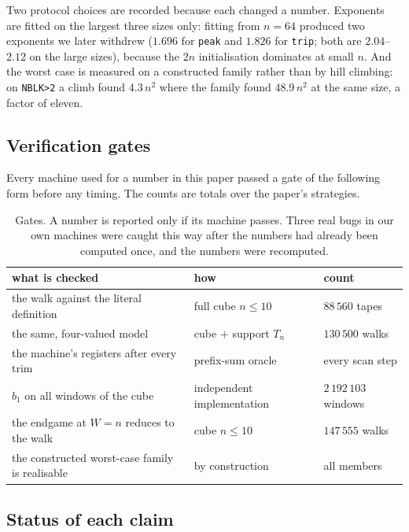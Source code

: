Two protocol choices are recorded because each changed a number. Exponents are fitted on the largest
three sizes only: fitting from $n=64$ produced two exponents we later withdrew ($1.696$ for
\texttt{peak} and $1.826$ for \texttt{trip}; both are $2.04$--$2.12$ on the large sizes), because the
$2n$ initialisation dominates at small $n$. And the worst case is measured on a constructed family
rather than by hill climbing: on \texttt{NBLK>2} a climb found $4.3\,n^{2}$ where the family found
$48.9\,n^{2}$ at the same size, a factor of eleven.

\subsection{Verification gates}
\label{app:gates}

Every machine used for a number in this paper passed a gate of the
following form before any timing. The counts are totals over the paper's
strategies.

\begin{table}[h]
\centering
\small
\begin{tabular}{@{}lll@{}}
\toprule
what is checked & how & count \\
\midrule
the walk against the literal definition & full cube $n\le10$ & $88\,560$ tapes \\
the same, four-valued model & cube $+$ support $T_n$ & $130\,500$ walks \\
the machine's registers after every trim & prefix-sum oracle & every scan step \\
$b_1$ on all windows of the cube & independent implementation & $2\,192\,103$ windows \\
the endgame at $W=n$ reduces to the walk & cube $n\le10$ & $147\,555$ walks \\
the constructed worst-case family is realisable & by construction & all members \\
\bottomrule
\end{tabular}
\caption{Gates. A number is reported only if its machine passes. Three real
bugs in our own machines were caught this way after the numbers had
already been computed once, and the numbers were recomputed.}
\end{table}

\subsection{Status of each claim}
\label{app:status}

